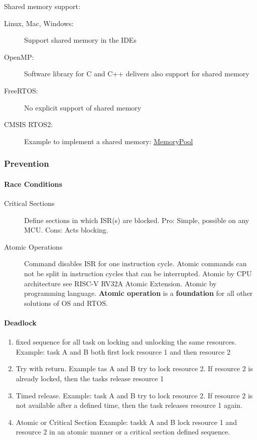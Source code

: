 Shared memory support:
\begin{description}
	\item[Linux, Mac, Windows:] Support shared memory in the IDEs
	\item[OpenMP:] Software library for C and C++ delivers also support for shared memory
	\item[FreeRTOS:] No explicit support of shared memory
	\item[CMSIS RTOS2:] Example to implement a shared memory: \href{https://arm-software.github.io/CMSIS_5/RTOS2/html/rtos_api2.html}{MemoryPool}
\end{description}

\subsubsection{Prevention}
\paragraph{Race Conditions}
\begin{description}
	\item[Critical Sections] Define sections in which ISR(s) are blocked.
	      Pro: Simple, possible on any MCU.
	      Cons: Acts blocking.
	\item[Atomic Operations] Command disables ISR for one instruction cycle.
	      Atomic commands can not be split in instruction cycles that can be interrupted.
	      Atomic by CPU architecture see RISC-V RV32A Atomic Extension.
	      Atomic by programming language.
	      \textbf{Atomic operation} is a \textbf{foundation} for all other solutions of OS and RTOS.
\end{description}

\paragraph{Deadlock}
\begin{enumerate}
	\item fixed sequence for all task on locking and unlocking the same resources.
	      Example: task A and B both first lock resource 1 and then resource 2
	\item Try with return.
	      Example tas A and B try to lock resource 2.
	      If resource 2 is already locked, then the tasks release resource 1
	\item Timed release.
	      Example: task A and B try to lock resource 2.
	      If resource 2 is not available after a defined time, then the task releases resource 1 again.
	\item Atomic or Critical Section
	      Example: taskk A and B lock resource 1 and resource 2 in an atomic manner or a critical section defined sequence.
\end{enumerate}

